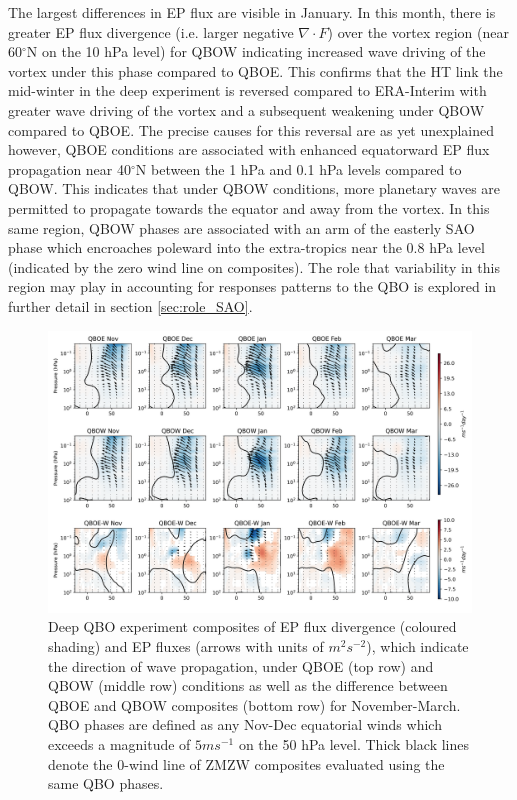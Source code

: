 The largest differences in EP flux are visible in January. In this month,
there is greater EP flux divergence (i.e. larger negative $\nabla \cdot F$) over the vortex region (near 60$^\circ$N on the 10 hPa level) for QBOW indicating increased wave driving of the vortex under this phase compared to QBOE. This confirms that the HT link the mid-winter in the deep experiment is reversed compared to ERA-Interim with greater wave driving of the vortex and a subsequent weakening under QBOW compared to QBOE. The precise causes for this reversal are as yet unexplained however, QBOE conditions are associated with enhanced equatorward EP flux propagation near 40$^\circ$N between the 1 hPa and 0.1 hPa levels compared to QBOW. This indicates that under QBOW conditions, more planetary waves are permitted to propagate towards the equator and away from the vortex. In this same region, QBOW phases are associated with an arm of the easterly SAO phase which encroaches poleward into the extra-tropics near the 0.8 hPa level (indicated by the zero wind line on composites). The role that variability in this region may play in accounting for responses patterns to the QBO is explored in further detail in section \ref{sec:role_SAO}.

\newpage
\begin{figure}[h!]
\begin{center}
\noindent\includegraphics[width = \linewidth]{Figures/Figures-deepQBO/EP_flux_composites_by_month_QBO_phases_d_higher_50hPa_5thresh.png}
\caption[EP flux composites under QBO phases in the deep QBO simulation]{Deep QBO experiment composites of EP flux divergence (coloured shading) and EP fluxes (arrows with units of $m^2s^{-2}$), which indicate the direction of wave propagation, under QBOE (top row) and QBOW (middle row) conditions as well as the difference between QBOE and QBOW composites (bottom row) for November-March. QBO phases are defined as any Nov-Dec equatorial winds which exceeds a magnitude of $5ms^{-1}$ on the 50 hPa level. Thick black lines denote the 0-wind line of ZMZW composites evaluated using the same QBO phases.}
\label{fig:EP_deep}
\end{center}
\end{figure}

